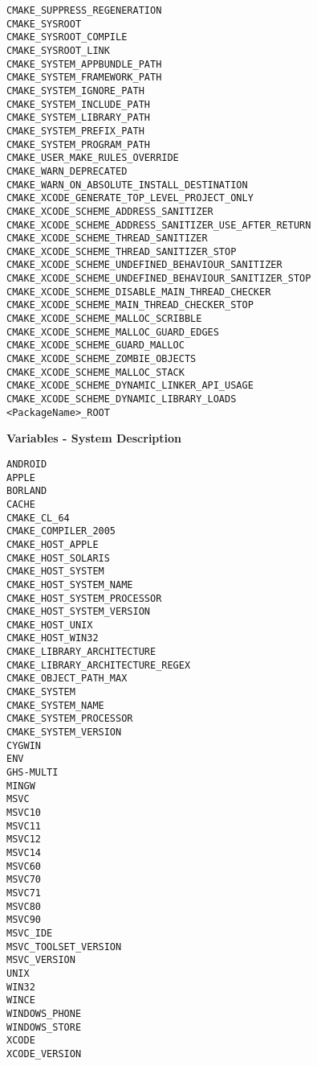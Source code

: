 \documentclass{article}
\begin{document}
\hfill\vline\hfill
\begin{minipage}[t]{0.18\linewidth}
\begin{verbatim}
CMAKE_SUPPRESS_REGENERATION
CMAKE_SYSROOT
CMAKE_SYSROOT_COMPILE
CMAKE_SYSROOT_LINK
CMAKE_SYSTEM_APPBUNDLE_PATH
CMAKE_SYSTEM_FRAMEWORK_PATH
CMAKE_SYSTEM_IGNORE_PATH
CMAKE_SYSTEM_INCLUDE_PATH
CMAKE_SYSTEM_LIBRARY_PATH
CMAKE_SYSTEM_PREFIX_PATH
CMAKE_SYSTEM_PROGRAM_PATH
CMAKE_USER_MAKE_RULES_OVERRIDE
CMAKE_WARN_DEPRECATED
CMAKE_WARN_ON_ABSOLUTE_INSTALL_DESTINATION
CMAKE_XCODE_GENERATE_TOP_LEVEL_PROJECT_ONLY
CMAKE_XCODE_SCHEME_ADDRESS_SANITIZER
CMAKE_XCODE_SCHEME_ADDRESS_SANITIZER_USE_AFTER_RETURN
CMAKE_XCODE_SCHEME_THREAD_SANITIZER
CMAKE_XCODE_SCHEME_THREAD_SANITIZER_STOP
CMAKE_XCODE_SCHEME_UNDEFINED_BEHAVIOUR_SANITIZER
CMAKE_XCODE_SCHEME_UNDEFINED_BEHAVIOUR_SANITIZER_STOP
CMAKE_XCODE_SCHEME_DISABLE_MAIN_THREAD_CHECKER
CMAKE_XCODE_SCHEME_MAIN_THREAD_CHECKER_STOP
CMAKE_XCODE_SCHEME_MALLOC_SCRIBBLE
CMAKE_XCODE_SCHEME_MALLOC_GUARD_EDGES
CMAKE_XCODE_SCHEME_GUARD_MALLOC
CMAKE_XCODE_SCHEME_ZOMBIE_OBJECTS
CMAKE_XCODE_SCHEME_MALLOC_STACK
CMAKE_XCODE_SCHEME_DYNAMIC_LINKER_API_USAGE
CMAKE_XCODE_SCHEME_DYNAMIC_LIBRARY_LOADS
<PackageName>_ROOT
\end{verbatim}

\textbf{Variables - System Description}
\begin{verbatim}
ANDROID
APPLE
BORLAND
CACHE
CMAKE_CL_64
CMAKE_COMPILER_2005
CMAKE_HOST_APPLE
CMAKE_HOST_SOLARIS
CMAKE_HOST_SYSTEM
CMAKE_HOST_SYSTEM_NAME
CMAKE_HOST_SYSTEM_PROCESSOR
CMAKE_HOST_SYSTEM_VERSION
CMAKE_HOST_UNIX
CMAKE_HOST_WIN32
CMAKE_LIBRARY_ARCHITECTURE
CMAKE_LIBRARY_ARCHITECTURE_REGEX
CMAKE_OBJECT_PATH_MAX
CMAKE_SYSTEM
CMAKE_SYSTEM_NAME
CMAKE_SYSTEM_PROCESSOR
CMAKE_SYSTEM_VERSION
CYGWIN
ENV
GHS-MULTI
MINGW
MSVC
MSVC10
MSVC11
MSVC12
MSVC14
MSVC60
MSVC70
MSVC71
MSVC80
MSVC90
MSVC_IDE
MSVC_TOOLSET_VERSION
MSVC_VERSION
UNIX
WIN32
WINCE
WINDOWS_PHONE
WINDOWS_STORE
XCODE
XCODE_VERSION
\end{verbatim}
\end{minipage}
\hfill\vline\hfill
\end{document}
